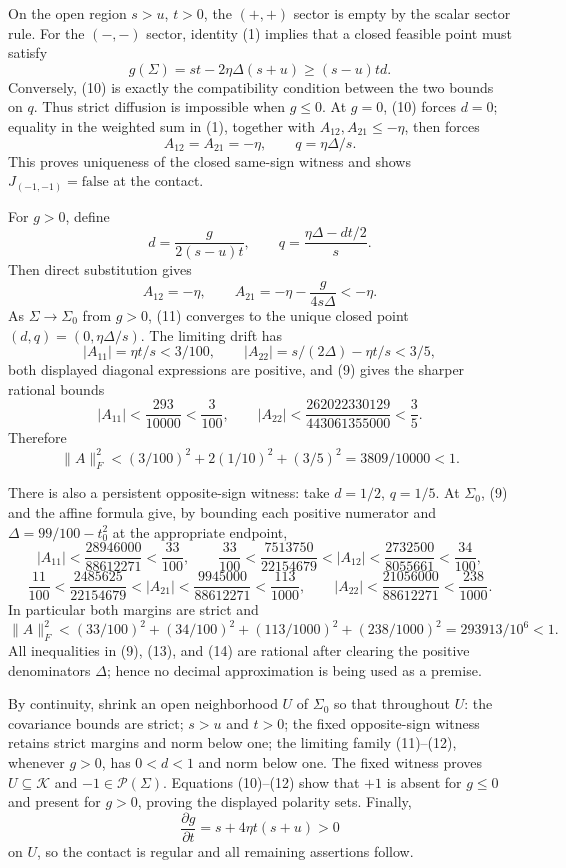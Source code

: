 On the open region \(s>u\), \(t>0\), the \((+,+)\) sector is empty by the scalar sector rule.  For the \((-,-)\) sector, identity (1) implies that a closed feasible point must satisfy
\[
 g(\Sigma)=st-2\eta\Delta(s+u)\ge(s-u)td. \tag{10}
\]
Conversely, (10) is exactly the compatibility condition between the two bounds on \(q\).  Thus strict diffusion is impossible when \(g\le0\).  At \(g=0\), (10) forces \(d=0\); equality in the weighted sum in (1), together with \(A_{12},A_{21}\le-\eta\), then forces
\[
 A_{12}=A_{21}=-\eta,\qquad q=\eta\Delta/s.
\]
This proves uniqueness of the closed same-sign witness and shows \(J_{(-1,-1)}=\mathrm{false}\) at the contact.

For \(g>0\), define
\[
 d=\frac{g}{2(s-u)t},\qquad
 q=\frac{\eta\Delta-dt/2}{s}. \tag{11}
\]
Then direct substitution gives
\[
 A_{12}=-\eta,\qquad
 A_{21}=-\eta-\frac{g}{4s\Delta}< -\eta. \tag{12}
\]
As \(\Sigma\to\Sigma_0\) from \(g>0\), (11) converges to the unique closed point \((d,q)=(0,\eta\Delta/s)\).  The limiting drift has
\[
 |A_{11}|=\eta t/s<3/100,\qquad
 |A_{22}|=s/(2\Delta)-\eta t/s<3/5,
\]
both displayed diagonal expressions are positive, and (9) gives the sharper rational bounds
\[
 |A_{11}|<\frac{293}{10000}<\frac3{100},\qquad
 |A_{22}|<\frac{262022330129}{443061355000}<\frac35.
\]
Therefore
\[
 \lVert A\rVert_F^2<(3/100)^2+2(1/10)^2+(3/5)^2
 =3809/10000<1. \tag{13}
\]

There is also a persistent opposite-sign witness: take \(d=1/2\), \(q=1/5\).  At \(\Sigma_0\), (9) and the affine formula give, by bounding each positive numerator and \(\Delta=99/100-t_0^2\) at the appropriate endpoint,
\[
 |A_{11}|<\frac{28946000}{88612271}<\frac{33}{100},
 \qquad
 \frac{33}{100}<\frac{7513750}{22154679}<|A_{12}|<
 \frac{2732500}{8055661}<\frac{34}{100},
\]
\[
 \frac{11}{100}<\frac{2485625}{22154679}<|A_{21}|<
 \frac{9945000}{88612271}<\frac{113}{1000},
 \qquad
 |A_{22}|<\frac{21056000}{88612271}<\frac{238}{1000}.
\]
In particular both margins are strict and
\[
 \lVert A\rVert_F^2
 <(33/100)^2+(34/100)^2+(113/1000)^2+(238/1000)^2
 =293913/10^6<1. \tag{14}
\]
All inequalities in (9), (13), and (14) are rational after clearing the positive denominators \(\Delta\); hence no decimal approximation is being used as a premise.

By continuity, shrink an open neighborhood \(U\) of \(\Sigma_0\) so that throughout \(U\): the covariance bounds are strict; \(s>u\) and \(t>0\); the fixed opposite-sign witness retains strict margins and norm below one; the limiting family (11)--(12), whenever \(g>0\), has \(0<d<1\) and norm below one.  The fixed witness proves \(U\subseteq\mathcal K\) and \(-1\in\mathcal P(\Sigma)\).  Equations (10)--(12) show that \(+1\) is absent for \(g\le0\) and present for \(g>0\), proving the displayed polarity sets.  Finally,
\[
 \frac{\partial g}{\partial t}=s+4\eta t(s+u)>0
\]
on \(U\), so the contact is regular and all remaining assertions follow.

